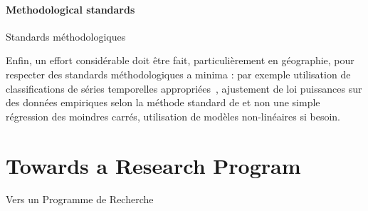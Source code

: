 

\paragraph{Methodological standards}{Standards méthodologiques}


Enfin, un effort considérable doit être fait, particulièrement en géographie, pour respecter des standards méthodologiques a minima : par exemple utilisation de classifications de séries temporelles appropriées~\cite{liao2005clustering}, ajustement de loi puissances sur des données empiriques selon la méthode standard de \cite{clauset2009power} et non une simple régression des moindres carrés, utilisation de modèles non-linéaires si besoin.







%




\stars





\section*{Towards a Research Program}{Vers un Programme de Recherche}

